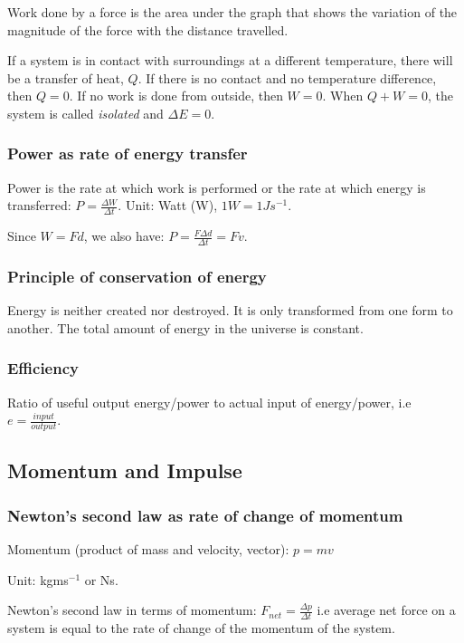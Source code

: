 Work done by a force is the area under the graph that shows the variation of
the magnitude of the force with the distance travelled.

If a system is in contact with surroundings at a different temperature, there
will be a transfer of heat, $Q$. If there is no contact and no temperature
difference, then $Q = 0$. If no work is done from outside, then $W = 0$. When
$Q + W = 0$, the system is called \textit{isolated} and $\Delta E = 0$.

\subsubsection{Power as rate of energy transfer}
Power is the rate at which work is performed or the rate at which energy is
transferred: $P = \frac{\Delta W}{\Delta t}$. Unit: Watt (W),
$1 W = 1 Js^{-1}$.

Since $W = Fd$, we also have: $P = \frac{F \Delta d}{\Delta t} = Fv$.

\subsubsection{Principle of conservation of energy}
Energy is neither created nor destroyed. It is only transformed from one form
to another. The total amount of energy in the universe is constant.

\subsubsection{Efficiency}
Ratio of useful output energy/power to actual input of energy/power, i.e
$e = \frac{input}{output}$.

\subsection{Momentum and Impulse}

\subsubsection{Newton's second law as rate of change of momentum}
Momentum (product of mass and velocity, vector): $p = mv$

Unit: kgms$^{-1}$ or Ns.

Newton's second law in terms of momentum: $F_{net} = \frac{\Delta p}{\Delta t}$
i.e average net force on a system is equal to the rate of change of the
momentum of the system.

